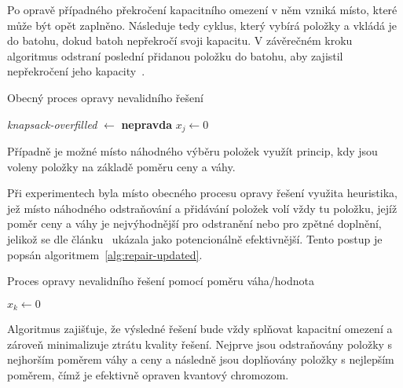 Po opravě případného překročení kapacitního omezení v něm vzniká místo, které může být opět zaplněno. 
Následuje tedy cyklus, který vybírá položky a vkládá je do batohu, dokud batoh nepřekročí svoji kapacitu. 
V závěrečném kroku algoritmus odstraní poslední přidanou položku do batohu, aby zajistil nepřekročení jeho kapacity~\cite{qiga}.
\begin{algorithm}[ht!]
    \caption{Obecný proces opravy nevalidního řešení~\cite{qiga}}
    \label{alg:repair}
    \textit{knapsack-overfilled} $\gets$ \textbf{nepravda}\;
    $x_j \gets 0$\;
\end{algorithm}

Případně je možné místo náhodného výběru položek využít princip, kdy jsou voleny položky na základě poměru ceny a váhy. 

Při experimentech byla místo obecného procesu opravy řešení využita heuristika, jež místo náhodného odstraňování a přidávání položek volí vždy tu položku, jejíž poměr ceny a váhy je nejvýhodnější pro odstranění nebo pro zpětné doplnění, jelikož se dle článku~\cite{repair1} ukázala jako potencionálně efektivnější. 
Tento postup je popsán algoritmem~\ref{alg:repair-updated}.
\begin{algorithm}[ht]
    \caption{Proces opravy nevalidního řešení pomocí poměru váha/hodnota~\cite{repair1,repair2,repair3}}
    \label{alg:repair-updated}
    $x_k \gets 0$\;
    \;
\end{algorithm}
Algoritmus zajišťuje, že výsledné řešení bude vždy splňovat kapacitní omezení a zároveň minimalizuje ztrátu kvality řešení. 
Nejprve jsou odstraňovány položky s nejhorším poměrem váhy a ceny a následně jsou doplňovány položky s nejlepším poměrem, čímž je efektivně opraven kvantový chromozom. 

